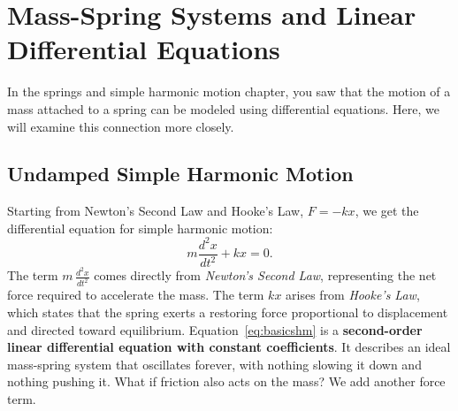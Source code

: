 \section{Mass-Spring Systems and Linear Differential Equations}
In the springs and simple harmonic motion chapter, you saw that the motion of a mass attached to a spring can be modeled using differential equations. Here, we will examine this connection more
closely.
\subsection{Undamped Simple Harmonic Motion}
Starting from Newton's Second Law and Hooke's Law, $F = -kx$, we get the differential equation for simple harmonic motion:
\begin{equation}
	m\frac{d^{2}x}{dt^{2}}+ kx = 0. \label{eq:basicshm}
\end{equation}
The term $m\,\frac{d^{2}x}{dt^{2}}$ comes directly from \textit{Newton's Second
Law}, representing the net force required to accelerate the mass. The term $kx$ arises from \textit{Hooke's Law}, which states that the spring exerts a restoring
force proportional to displacement and directed toward equilibrium. Equation~\eqref{eq:basicshm} is a \textbf{second-order linear differential equation
with constant coefficients}. It describes an ideal mass-spring
system that oscillates forever, with nothing slowing it down and nothing pushing it.
What if friction also acts on the mass? We add another force term.
